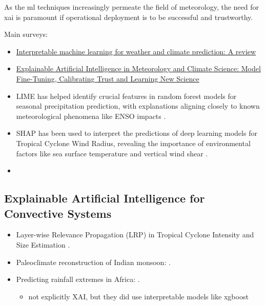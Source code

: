 As the \acrshort{ml} techniques increasingly permeate the field of meteorology, the need for \acrshort{xai} is paramount if operational deployment is to be successful and trustworthy.

Main surveys:
\begin{itemize}
    \item \href{https://www.sciencedirect.com/science/article/pii/S1352231024004722}{Interpretable machine learning for weather and climate prediction: A review}
    \item \href{https://link.springer.com/chapter/10.1007/978-3-031-04083-2_16#Sec2}{Explainable Artificial Intelligence in Meteorology and Climate Science: Model Fine-Tuning, Calibrating Trust and Learning New Science}
\end{itemize}

\begin{itemize}
    \item LIME has helped identify crucial features in random forest models for seasonal precipitation prediction, with explanations aligning closely to known meteorological phenomena like ENSO impacts .
    \item SHAP has been used to interpret the predictions of deep learning models for Tropical Cyclone Wind Radius, revealing the importance of environmental factors like sea surface temperature and vertical wind shear .
    \item 
\end{itemize}

\subsection{Explainable Artificial Intelligence for Convective Systems}

\begin{itemize}
    \item Layer-wise Relevance Propagation (LRP) in Tropical Cyclone Intensity and Size Estimation .
    \item Paleoclimate reconstruction of Indian monsoon: .
    \item Predicting rainfall extremes in Africa: .
    \begin{itemize}
        \item not explicitly XAI, but they did use interpretable models like xgboost
    \end{itemize}
\end{itemize}

